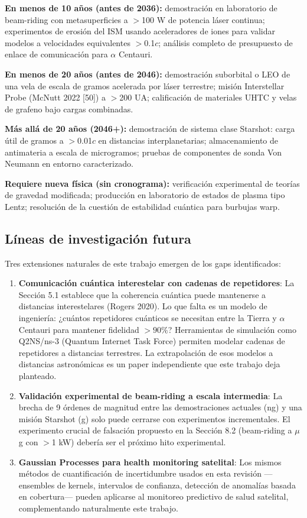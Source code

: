 \documentclass[11pt,a4paper,onecolumn]{article}
\begin{document}
\textbf{En menos de 10 años (antes de 2036):} demostración en laboratorio de beam-riding con metasuperficies a $>$100 W de potencia láser continua; experimentos de erosión del ISM usando aceleradores de iones para validar modelos a velocidades equivalentes $>$0.1$c$; análisis completo de presupuesto de enlace de comunicación para $\alpha$ Centauri.

\textbf{En menos de 20 años (antes de 2046):} demostración suborbital o LEO de una vela de escala de gramos acelerada por láser terrestre; misión Interstellar Probe (McNutt 2022 [50]) a $>$200 UA; calificación de materiales UHTC y velas de grafeno bajo cargas combinadas.

\textbf{Más allá de 20 años (2046+):} demostración de sistema clase Starshot: carga útil de gramos a $>$0.01$c$ en distancias interplanetarias; almacenamiento de antimateria a escala de microgramos; pruebas de componentes de sonda Von Neumann en entorno caracterizado.

\textbf{Requiere nueva física (sin cronograma):} verificación experimental de teorías de gravedad modificada; producción en laboratorio de estados de plasma tipo Lentz; resolución de la cuestión de estabilidad cuántica para burbujas warp.

\subsection{Líneas de investigación futura}

Tres extensiones naturales de este trabajo emergen de los gaps identificados:

\begin{enumerate}
  \item \textbf{Comunicación cuántica interestelar con cadenas de repetidores}: La Sección 5.1 establece que la coherencia cuántica puede mantenerse a distancias interestelares (Rogers 2020). Lo que falta es un modelo de ingeniería: ¿cuántos repetidores cuánticos se necesitan entre la Tierra y $\alpha$ Centauri para mantener fidelidad $>90\%$? Herramientas de simulación como Q2NS/ns-3 (Quantum Internet Task Force) permiten modelar cadenas de repetidores a distancias terrestres. La extrapolación de esos modelos a distancias astronómicas es un paper independiente que este trabajo deja planteado.

  \item \textbf{Validación experimental de beam-riding a escala intermedia}: La brecha de 9 órdenes de magnitud entre las demostraciones actuales (ng) y una misión Starshot (g) solo puede cerrarse con experimentos incrementales. El experimento crucial de falsación propuesto en la Sección 8.2 (beam-riding a $\mu$g con $>$1 kW) debería ser el próximo hito experimental.

  \item \textbf{Gaussian Processes para health monitoring satelital}: Los mismos métodos de cuantificación de incertidumbre usados en esta revisión —ensembles de kernels, intervalos de confianza, detección de anomalías basada en cobertura— pueden aplicarse al monitoreo predictivo de salud satelital, complementando naturalmente este trabajo.
\end{enumerate}
\end{document}
